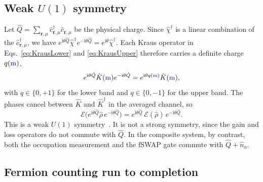 \documentclass[aps,prb,10pt,twocolumn,superscriptaddress,longbibliography,floatfix]{revtex4-2}
\newcommand{\ii}{\mathrm{i}}
\newcommand{\mc}[1]{\mathcal{#1}}
\newcommand{\bfr}{\boldsymbol r}
\newcommand{\newtext}[1]{{\color{blue}#1}}
\begin{document}
\subsection{Weak \texorpdfstring{$U(1)$}{U(1)} symmetry}

Let $\hat Q=\sum_{\bfr,\mu}\hat c^\dagger_{\bfr,\mu}\hat c_{\bfr,\mu}$ be the physical charge. Since $\hat\chi^\dagger$ is a linear combination of the $\hat c^\dagger_{\bfr,\mu}$, we have $e^{\ii\theta\hat Q}\hat\chi^\dagger e^{-\ii\theta\hat Q}=e^{\ii\theta}\hat\chi^\dagger$. Each Kraus operator in Eqs.~\eqref{eq:KrausLower} and \eqref{eq:KrausUpper} therefore carries a definite charge $q(\newtext{\mathrm{m}})$,
\begin{equation}
    e^{\ii\theta\hat Q}\hat K(\newtext{\mathrm{m}})e^{-\ii\theta\hat Q}=e^{\ii\theta q(\newtext{\mathrm{m}})}\hat K(\newtext{\mathrm{m}}),
    \label{eq:KrausCharge}
\end{equation}
with $q\in\{0,+1\}$ for the lower band and $q\in\{0,-1\}$ for the upper band. The phases cancel between $\hat K$ and $\hat K^\dagger$ in the averaged channel, so
\begin{equation}
    \mc E\big(e^{\ii\theta\hat Q}\hat\rho\,e^{-\ii\theta\hat Q}\big)=e^{\ii\theta\hat Q}\,\mc E(\hat\rho)\,e^{-\ii\theta\hat Q}.
    \label{eq:WeakU1}
\end{equation}
This is a weak $U(1)$ symmetry~\cite{BucaProsen2012,AlbertJiang2014}. It is not a strong symmetry, since the gain and loss operators do not commute with $\hat Q$. In the composite system, by contrast, both the occupation measurement and the fSWAP gate commute with $\hat Q+\hat n_a$.

\subsection{Fermion counting run to completion}
\end{document}
